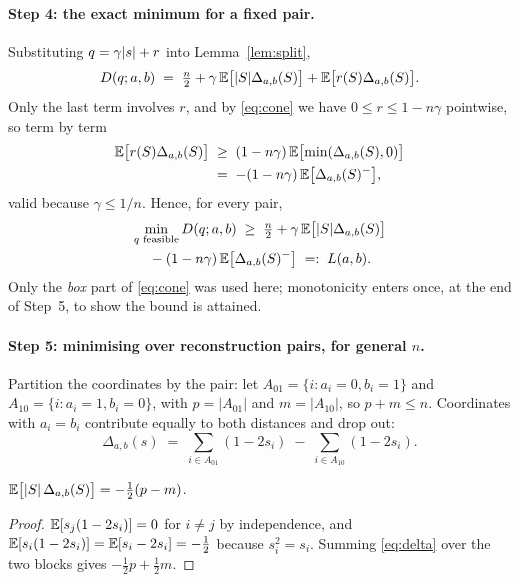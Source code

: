 \paragraph{Step 4: the exact minimum for a fixed pair.}
Substituting $q = \gamma|s| + r$ into Lemma~\ref{lem:split},
\[
  D(q;a,b) \;=\; \tfrac{n}{2}
   + \gamma\,\mathbb{E}\bigl[|S|\Delta_{a,b}(S)\bigr]
   + \mathbb{E}\bigl[r(S)\Delta_{a,b}(S)\bigr].
\]
Only the last term involves $r$, and by \eqref{eq:cone} we have
$0 \le r \le 1-n\gamma$ pointwise, so term by term
\begin{align*}
  \mathbb{E}\bigl[r(S)\Delta_{a,b}(S)\bigr]
  &\;\ge\; (1-n\gamma)\,\mathbb{E}\bigl[\min(\Delta_{a,b}(S),0)\bigr] \\
  &\;=\; -(1-n\gamma)\,\mathbb{E}\bigl[\Delta_{a,b}(S)^-\bigr],
\end{align*}
valid because $\gamma \le 1/n$. Hence, for every pair,
\begin{multline}
  \min_{q \text{ feasible}} D(q;a,b) \;\ge\;
  \tfrac{n}{2} + \gamma\,\mathbb{E}\bigl[|S|\Delta_{a,b}(S)\bigr] \\
  {} - (1-n\gamma)\,\mathbb{E}\bigl[\Delta_{a,b}(S)^-\bigr]
  \;=:\; L(a,b).
  \label{eq:LB}
\end{multline}
Only the \emph{box} part of \eqref{eq:cone} was used here; monotonicity enters
once, at the end of Step~5, to show the bound is attained.

\paragraph{Step 5: minimising over reconstruction pairs, for general $n$.}
Partition the coordinates by the pair: let
$A_{01} = \{i : a_i = 0, b_i = 1\}$ and $A_{10} = \{i : a_i = 1, b_i = 0\}$, with
$p = |A_{01}|$ and $m = |A_{10}|$, so $p + m \le n$. Coordinates with $a_i = b_i$
contribute equally to both distances and drop out:
\begin{equation}
  \Delta_{a,b}(s) \;=\; \sum_{i \in A_{01}} (1 - 2s_i)
                     \;-\; \sum_{i \in A_{10}} (1 - 2s_i).
  \label{eq:delta}
\end{equation}

\begin{lemma}
\label{lem:firstmoment}
$\mathbb{E}\bigl[|S|\,\Delta_{a,b}(S)\bigr] = -\tfrac{1}{2}(p-m)$.
\end{lemma}

\begin{proof}
$\mathbb{E}[s_j(1-2s_i)] = 0$ for $i \ne j$ by independence, and
$\mathbb{E}[s_i(1-2s_i)] = \mathbb{E}[s_i - 2s_i] = -\tfrac12$ because $s_i^2 = s_i$. Summing
\eqref{eq:delta} over the two blocks gives $-\tfrac12 p + \tfrac12 m$.
\end{proof}

